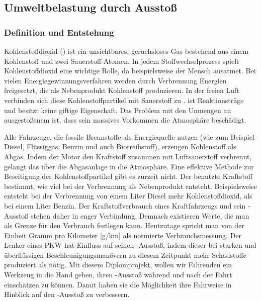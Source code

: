 \subsection{Umweltbelastung durch  Ausstoß}

\subsubsection{Definition und Entstehung}
Kohlenstoffdioxid () ist ein unsichtbares, geruchsloses Gas bestehend aus einem Kohlenstoff und zwei Sauerstoff-Atomen. 
In jedem Stoffwechselprozess spielt Kohlenstoffdioxid eine wichtige Rolle, da beispielsweise der Mensch  ausatmet. 
Bei vielen Energiegewinnungsverfahren werden durch Verbrennung Energien freigesetzt, die als Nebenprodukt Kohlenstoff produzieren. 
In der freien Luft verbinden sich diese Kohlenstoffpartikel mit Sauerstoff zu .
 ist Reaktionsträge und besitzt keine giftige Eigenschaft. 
Das Problem mit den Unmengen an ausgestoßenem  ist, dass sein massives Vorkommen die Atmosphäre beschädigt.

Alle Fahrzeuge, die fossile Brennstoffe als Energiequelle nutzen 
(wie zum Beispiel Diesel, Flüssiggas, Benzin und auch Biotreibstoff), erzeugen Kohlenstoff als Abgas. 
Indem der Motor den Kraftstoff zusammen mit Luftsauerstoff verbrennt, gelangt das  über die Abgasanlage in die Atmosphäre. 
Eine effektive Methode zur Beseitigung der Kohlenstoffpartikel gibt es zurzeit nicht. 
Der benutzte Kraftstoff bestimmt, wie viel  bei der Verbrennung als Nebenprodukt entsteht.
Beispielsweise entsteht bei der Verbrennung von einem Liter Diesel mehr Kohlenstoffdioxid, als bei einem Liter Benzin.
Der Kraftstoffverbrauch eines Kraftfahrzeugs und sein -Ausstoß stehen daher in enger Verbindung.
Demnach existieren Werte, die man als Grenze für den Verbrauch festlegen kann. 
Heutzutage spricht man von der Einheit Gramm pro Kilometer [g/km] als normierte Verbrauchsmessung.
Der Lenker eines PKW hat Einfluss auf seinen -Ausstoß, indem dieser bei starken und überflüssigen Beschleunigungsmanövern
zu diesem Zeitpunkt mehr Schadstoffe produziert als nötig.
Mit diesem Diplomprojekt, wollen wir Fahrenden ein Werkzeug in die Hand geben, ihren -Ausstoß während und nach der Fahrt
einschätzen zu können. Damit haben sie die Möglichkeit ihre Fahrweise in Hinblick auf den -Ausstoß zu verbessern.

\clearpage

